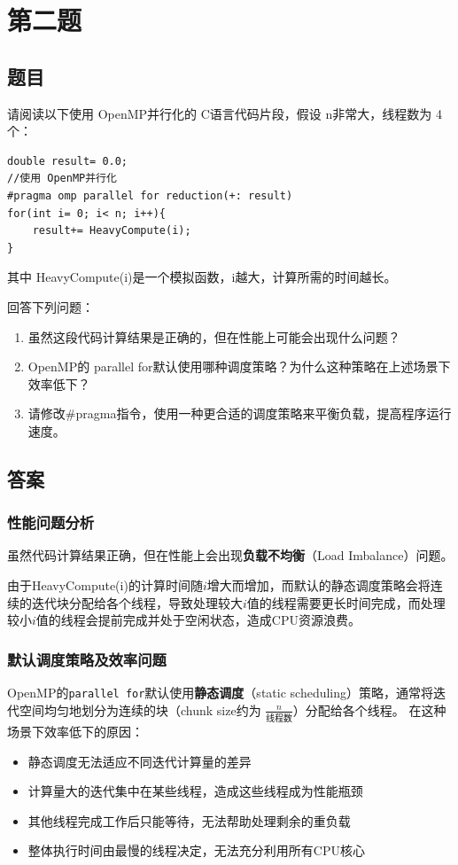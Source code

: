 \chapter{第二题}

\section{题目}

请阅读以下使用 OpenMP并行化的 C语言代码片段，假设 n非常大，线程数为 4个：
\begin{lstlisting}[style=cleancpp]
double result= 0.0;
//使用 OpenMP并行化 
#pragma omp parallel for reduction(+: result) 
for(int i= 0; i< n; i++){ 
    result+= HeavyCompute(i); 
}
\end{lstlisting}
其中 HeavyCompute(i)是一个模拟函数，i越大，计算所需的时间越长。

回答下列问题：
\begin{enumerate}
    \item 虽然这段代码计算结果是正确的，但在性能上可能会出现什么问题？
    \item OpenMP的 parallel for默认使用哪种调度策略？为什么这种策略在上述场景下效率低下？
    \item 请修改\#pragma指令，使用一种更合适的调度策略来平衡负载，提高程序运行速度。
\end{enumerate}

\section{答案}
\subsection{性能问题分析}

虽然代码计算结果正确，但在性能上会出现\textbf{负载不均衡}（Load Imbalance）问题。

由于HeavyCompute(i)的计算时间随$i$增大而增加，而默认的静态调度策略会将连续的迭代块分配给各个线程，导致处理较大$i$值的线程需要更长时间完成，而处理较小$i$值的线程会提前完成并处于空闲状态，造成CPU资源浪费。

\subsection{默认调度策略及效率问题}

OpenMP的\texttt{parallel for}默认使用\textbf{静态调度}（static scheduling）策略，通常将迭代空间均匀地划分为连续的块（chunk size约为 $\frac{n}{\text{线程数}}$）分配给各个线程。
在这种场景下效率低下的原因：
\begin{itemize}
    \item 静态调度无法适应不同迭代计算量的差异
    \item 计算量大的迭代集中在某些线程，造成这些线程成为性能瓶颈
    \item 其他线程完成工作后只能等待，无法帮助处理剩余的重负载
    \item 整体执行时间由最慢的线程决定，无法充分利用所有CPU核心
\end{itemize}

